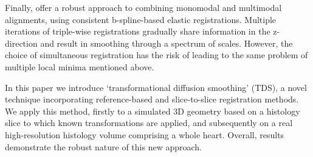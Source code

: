   Finally, \cite{Arganda-Carreras2010} offer a robust approach to combining monomodal and multimodal alignments, using consistent b-spline-based elastic registrations. Multiple iterations of triple-wise registrations gradually share information in the z-direction and result in smoothing through a spectrum of scales. However, the choice of simultaneous registration has the risk of leading to the same problem of multiple local minima mentioned above.
  
  In this paper we introduce ‘transformational diffusion smoothing’ (TDS), a novel technique incorporating reference-based and slice-to-slice registration methods. We apply this method, firstly to a simulated 3D geometry based on a histology slice to which known transformations are applied, and subsequently on a real high-resolution histology volume comprising a whole heart.  Overall, results demonstrate the robust nature of this new approach.
  


